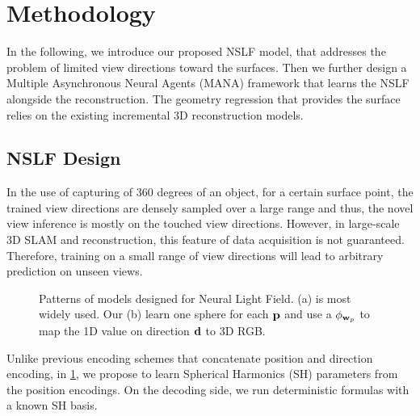 \section{Methodology}
In the following, we introduce our proposed NSLF model, that addresses the problem of limited view directions toward the surfaces.
Then we further design a Multiple Asynchronous Neural Agents (MANA) framework that learns the NSLF alongside the reconstruction.
The geometry regression that provides the surface relies on the existing incremental 3D reconstruction models. 
\vspace{-.3cm}
\subsection{NSLF Design}
In the use of capturing of 360 degrees of an object, for a certain surface point, the trained view directions are densely sampled over a large range and thus, the novel view inference is mostly on the touched view directions.
However, in large-scale 3D SLAM and reconstruction, this feature of data acquisition is not guaranteed. 
Therefore, training on a small range of view directions will lead to arbitrary prediction on unseen views.

\begin{figure}[t]%
	\centering
\caption{Patterns of models designed for Neural Light Field. (a) is most widely used. 
	Our (b) learn one sphere for each $\mathbf p$ and use a $\phi_{\mathbf w_p}$ to map the 1D value on direction $\mathbf d$ to 3D RGB.}
\label{fig:NSLF}
\vspace{-.6cm}
\end{figure}

Unlike previous encoding schemes that concatenate position and direction encoding, in \cref{fig:NSLF}, we propose to learn Spherical Harmonics (SH) parameters from the position encodings.
On the decoding side, we run deterministic formulas with a known SH basis.


